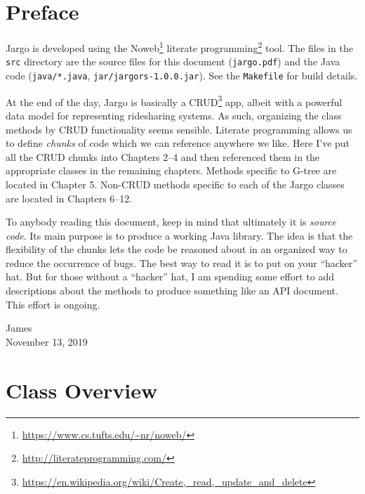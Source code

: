 \chapter*{Preface}
\label{preface}


Jargo is developed using the
Noweb\footnote{\url{https://www.cs.tufts.edu/~nr/noweb/}} literate
programming\footnote{\url{http://literateprogramming.com/}} tool.  The files in
the {\tt{}src} directory are the source files for this document
({\tt{}jargo.pdf}) and the Java code ({\tt{}java/*.java}, {\tt{}jar/jargors-1.0.0.jar}).
See the \texttt{Makefile} for build details.

At the end of the day, Jargo is basically a
CRUD\footnote{\url{https://en.wikipedia.org/wiki/Create,_read,_update_and_delete}}
app, albeit with a powerful data model for representing ridesharing systems. As
such, organizing the class methods by CRUD functionality seems sensible.
Literate programming allows us to define \emph{chunks} of code which we can
reference anywhere we like. Here I've put all the CRUD chunks into
Chapters 2--4 and then referenced them in the appropriate classes in the
remaining chapters. Methods specific to G-tree are located in Chapter 5.
Non-CRUD methods specific to each of the Jargo classes are located in Chapters
6--12.

To anybody reading this document, keep in mind that ultimately it is
\emph{source code}. Its main purpose is to produce a working Java library. The
idea is that the flexibility of the chunks lets the code be reasoned about in
an organized way to reduce the occurrence of bugs. The best way to read it is
to put on your ``hacker'' hat.  But for those without a ``hacker'' hat, I am
spending some effort to add descriptions about the methods to produce something
like an API document. This effort is ongoing.

\bigskip
\begin{flushright}
James\\
November 13, 2019
\end{flushright}

\chapter*{Class Overview}
\label{overview}


